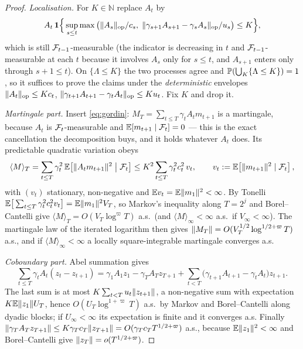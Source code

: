 \begin{proof}
\emph{Localisation.} For $K\in\mathbb N$ replace $A_t$ by
\[
A_t\,\mathbf{1}\Big\{\sup_{s\le t}\max\big(\lVert A_s \rVert_{\mathrm{op}}/c_s,\;
\lVert \gamma_{s+1}A_{s+1}-\gamma_sA_s \rVert_{\mathrm{op}}/u_s\big)\le K\Big\},
\]
which is still $\mathcal{F}_{t-1}$-measurable (the indicator is decreasing in $t$ and $\mathcal{F}_{t-1}$-measurable at
each $t$ because it involves $A_s$ only for $s\le t$, and $A_{s+1}$ enters only through
$s+1\le t$). On $\{\Lambda\le K\}$ the two processes agree and
$\mathbb{P}(\bigcup_K\{\Lambda\le K\})=1$, so it suffices to prove the claims under the
\emph{deterministic} envelopes $\lVert A_t \rVert_{\mathrm{op}}\le Kc_t$,
$\lVert \gamma_{t+1}A_{t+1}-\gamma_tA_t \rVert_{\mathrm{op}}\le Ku_t$. Fix $K$ and drop it.

\emph{Martingale part.} Insert \eqref{eq:gordin}: $M_T=\sum_{t\le T}\gamma_tA_tm_{t+1}$ is a
martingale, because $A_t$ is $\mathcal{F}_t$-measurable and $\mathbb{E}[m_{t+1}\mid\mathcal{F}_t]=0$ --- this is
the exact cancellation the decomposition buys, and it holds whatever $A_t$ does. Its
predictable quadratic variation obeys
\[
\langle M\rangle_T=\sum_{t\le T}\gamma_t^2\,\mathbb{E}\!\left[\lVert A_tm_{t+1} \rVert^2\;\middle|\;\mathcal{F}_t\right]
\le K^2\sum_{t\le T}\gamma_t^2c_t^2\,v_t,
\qquad v_t:=\mathbb{E}\!\left[\lVert m_{t+1} \rVert^2\mid\mathcal{F}_t\right],
\]
with $(v_t)$ stationary, non-negative and $\mathbb{E} v_t=\mathbb{E}\lVert m_1 \rVert^2<\infty$. By Tonelli
$\mathbb{E}\big[\sum_{t\le T}\gamma_t^2c_t^2v_t\big]=\mathbb{E}\lVert m_1 \rVert^2V_T$, so Markov's inequality along
$T=2^j$ and Borel--Cantelli give $\langle M\rangle_T=O(V_T\log^{\varpi}T)$ a.s.\ (and
$\langle M\rangle_\infty<\infty$ a.s.\ if $V_\infty<\infty$). The martingale law of the
iterated logarithm then gives $\lVert M_T \rVert=O(V_T^{1/2}\log^{1/2+\varpi}T)$ a.s., and if
$\langle M\rangle_\infty<\infty$ a locally square-integrable martingale converges a.s.

\emph{Coboundary part.} Abel summation gives
\[
\sum_{t\le T}\gamma_tA_t(z_t-z_{t+1})
=\gamma_1A_1z_1-\gamma_TA_Tz_{T+1}
+\sum_{t<T}\big(\gamma_{t+1}A_{t+1}-\gamma_tA_t\big)z_{t+1}.
\]
The last sum is at most $K\sum_{t<T}u_t\lVert z_{t+1} \rVert$, a non-negative sum with expectation
$K\mathbb{E}\lVert z_1 \rVert U_T$, hence $O(U_T\log^{1+\varpi}T)$ a.s.\ by Markov and Borel--Cantelli along
dyadic blocks; if $U_\infty<\infty$ its expectation is finite and it converges a.s. Finally
$\lVert \gamma_TA_Tz_{T+1} \rVert\le K\gamma_Tc_T\lVert z_{T+1} \rVert=O(\gamma_Tc_TT^{1/2+\varpi})$ a.s.,
because $\mathbb{E}\lVert z_1 \rVert^2<\infty$ and Borel--Cantelli give
$\lVert z_T \rVert=o(T^{1/2+\varpi})$.
\end{proof}

